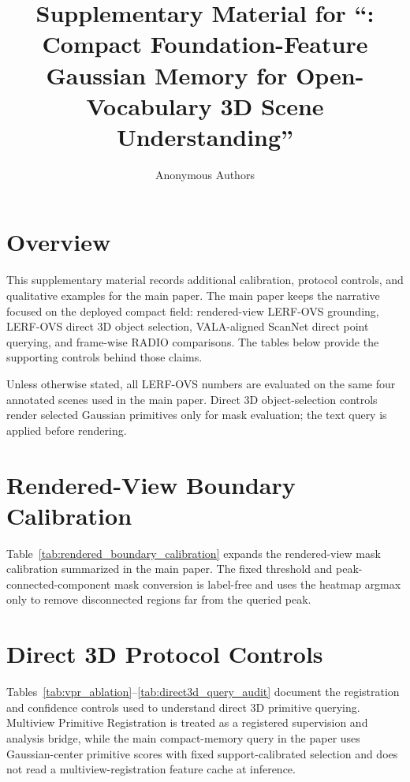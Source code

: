 \documentclass[10pt,journal,onecolumn]{IEEEtran}
\title{Supplementary Material for ``\method{}: Compact Foundation-Feature Gaussian Memory for Open-Vocabulary 3D Scene Understanding''}
\author{Anonymous Authors}
\begin{document}
\maketitle

\section{Overview}

This supplementary material records additional calibration, protocol controls,
and qualitative examples for the main paper. The main paper keeps the narrative
focused on the deployed compact field: rendered-view LERF-OVS grounding,
LERF-OVS direct 3D object selection, VALA-aligned ScanNet direct
point querying, and frame-wise RADIO comparisons. The tables below provide
the supporting controls behind those claims.

Unless otherwise stated, all LERF-OVS numbers are evaluated on the same four
annotated scenes used in the main paper. Direct 3D object-selection controls
render selected Gaussian primitives only for mask evaluation; the text query is
applied before rendering.

\section{Rendered-View Boundary Calibration}

Table~\ref{tab:rendered_boundary_calibration} expands the rendered-view mask
calibration summarized in the main paper. The fixed threshold and
peak-connected-component mask conversion is label-free and uses the heatmap argmax only to
remove disconnected regions far from the queried peak.



\section{Direct 3D Protocol Controls}

Tables~\ref{tab:vpr_ablation}--\ref{tab:direct3d_query_audit} document the
registration and confidence controls used to understand direct 3D primitive
querying. Multiview Primitive Registration is treated as a registered
supervision and analysis bridge, while the main compact-memory query in the
paper uses Gaussian-center primitive scores with fixed support-calibrated
selection and does not read a multiview-registration feature cache at
inference.


\end{document}
